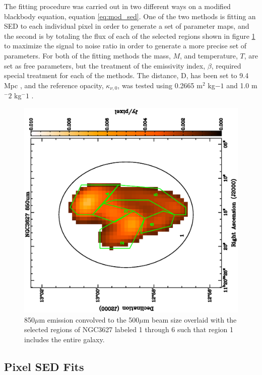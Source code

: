 The fitting procedure was carried out in two different ways on a modified blackbody equation, equation \ref{eq:mod_sed}.  One of the two methods is fitting an SED to each individual pixel in order to generate a set of parameter maps, and the second is by totaling the flux of each of the selected regions shown in figure \ref{fig:regions} to maximize the signal to noise ratio in order to generate a more precise set of parameters.  For both of the fitting methods the mass, $M$, and temperature, $T$, are set as free parameters, but the treatment of the emissivity index, $\beta$, required special treatment for each of the methods.  The distance, D, has been set to 9.4 Mpc \citep{walter2008}, and the reference opacity, $\kappa_{\nu,0}$, was tested using 0.2665 m$^2$ kg$-1$ \citep{li2001} and 1.0 m$^-2$ kg$^-1$ \citep{planckxxv2011}.

\begin{figure}
  \centering
  \includegraphics[width=1.\textwidth,angle=270]{sed_imgs/regions.eps}
  \caption[NGC3627 Regions]{850$\mu$m emission convolved to the 500$\mu$m beam size overlaid with the selected regions of NGC3627 labeled 1 through 6 such that region 1 includes the entire galaxy.}
  \label{fig:regions}
\end{figure}

\subsection{Pixel SED Fits}

